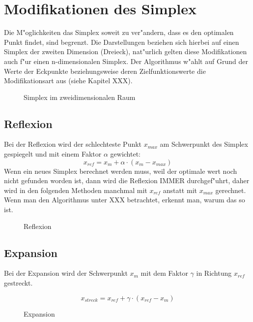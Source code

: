 
\section{Modifikationen des Simplex}
Die M"oglichkeiten das Simplex soweit zu ver"andern, dass es den optimalen Punkt findet, sind begrenzt.
Die Darstellungen beziehen sich hierbei auf einen Simplex der zweiten Dimension (Dreieck), nat"urlich gelten diese Modifikationen auch f"ur einen n-dimensionalen Simplex. Der Algorithmus w"ahlt auf Grund der Werte der Eckpunkte beziehungsweise deren Zielfunktionswerte die Modifikationsart aus (siehe Kapitel XXX).

\begin{figure}[h]
	\centering
  	\caption{Simplex im zweidimensionalen Raum}%
	\label{fig:Dreieck}%
\end{figure}

\subsection{Reflexion}
Bei der Reflexion wird der schlechteste Punkt $x_{max}$ am Schwerpunkt des Simplex gespiegelt und mit einem Faktor $\alpha$ gewichtet: 
\begin{equation}
x_{ref} = x_m + \alpha \cdot (x_m-x_{max})
\end{equation}
Wenn ein neues Simplex berechnet werden muss, weil der optimale wert noch nicht gefunden worden ist, dann wird die Reflexion IMMER durchgef"uhrt, daher wird in den folgenden Methoden manchmal mit $x_{ref}$ anstatt mit $x_{max}$ gerechnet. Wenn man den Algorithmus unter XXX betrachtet, erkennt man, warum das so ist.  
\begin{figure}[h]
	\centering
  	\caption{Reflexion}%
	\label{fig:Reflexion}%
\end{figure}

\subsection{Expansion}
Bei der Expansion wird der Schwerpunkt $x_m$ mit dem Faktor $\gamma$ in Richtung $x_{ref}$ gestreckt. 

\begin{equation}
x_{streck} = x_{ref} + \gamma \cdot (x_{ref}-x_{m})
\end{equation}
\begin{figure}[h]
	\centering
  	\caption{Expansion}%
	\label{fig:Streckung}%
\end{figure}
\newpage
